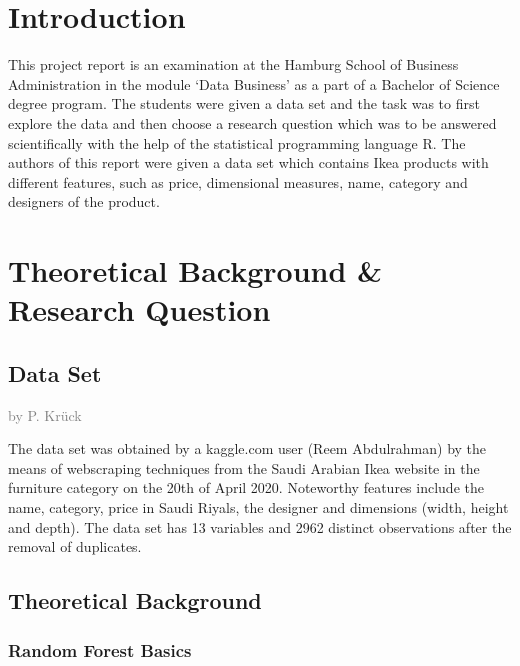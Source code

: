 \documentclass[a4paper, nobind]{templates/ociamthesis}
\begin{document}
\flushbottom

\hypertarget{intro}{%
\chapter{Introduction}\label{intro}}

This project report is an examination at the Hamburg School of Business Administration in the module `Data Business' as a part of a Bachelor of Science degree program. The students were given a data set and the task was to first explore the data and then choose a research question which was to be answered scientifically with the help of the statistical programming language R. The authors of this report were given a data set which contains Ikea products with different features, such as price, dimensional measures, name, category and designers of the product.

\hypertarget{chapter-2}{%
\chapter{Theoretical Background \& Research Question}\label{chapter-2}}

\hypertarget{data-set}{%
\section{Data Set}\label{data-set}}

\textcolor{gray}{by P. Krück}

The data set was obtained by a kaggle.com user (Reem Abdulrahman) by the means of webscraping techniques from the Saudi Arabian Ikea website in the furniture category on the 20th of April 2020. Noteworthy features include the name, category, price in Saudi Riyals, the designer and dimensions (width, height and depth).
The data set has 13 variables and 2962 distinct observations after the removal of duplicates.

\hypertarget{theoretical-background}{%
\section{Theoretical Background}\label{theoretical-background}}

\hypertarget{random-forest-basics}{%
\subsection{Random Forest Basics}\label{random-forest-basics}}
\end{document}
